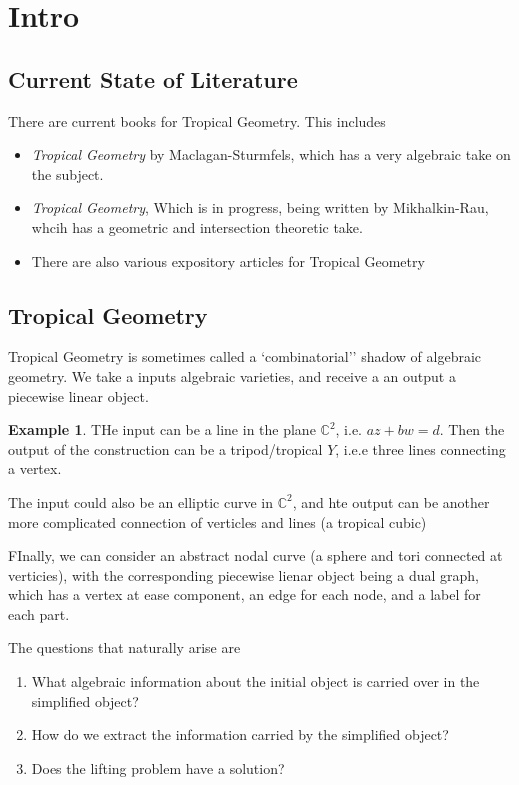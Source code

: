\documentclass[12pt]{memoir}
\theoremstyle{definition}
\newtheorem{protoexample}{Example}[section]
\newenvironment{ex}
   {\begin{protoexample}}
   {\end{protoexample}}
\def\CC{{\mathbb C}}
\begin{document}
\section{Intro}

\subsection{Current State of Literature}

There are current books for Tropical Geometry. This includes
\begin{itemize}
    \item \emph{Tropical Geometry} by Maclagan-Sturmfels, which has a very algebraic take on the subject.
    \item \emph{Tropical Geometry}, Which is in progress, being written by Mikhalkin-Rau, whcih has a geometric and intersection theoretic take.
    \item There are also various expository articles for Tropical Geometry
\end{itemize}

\subsection{Tropical Geometry}

Tropical Geometry is sometimes called a `combinatorial'' shadow of algebraic geometry. We take a inputs algebraic varieties, and receive a an output a piecewise linear object.

\begin{ex}
    THe input can be a line in the plane $\CC^2$, i.e. $az+bw=d$. Then the output of the construction can be a tripod/tropical $Y$, i.e.e three lines connecting a vertex.


    The input could also be an elliptic curve in $\CC^2$, and hte output can be another more complicated connection of verticles and lines (a tropical cubic)


    FInally, we can consider an abstract  nodal curve (a sphere and tori connected at verticies), with the corresponding piecewise lienar object being a dual graph, which has a vertex at ease component, an edge for each node, and a label for each part.
\end{ex}



The questions that naturally arise are
\begin{enumerate}
    \item What algebraic information about the initial object is carried over in the simplified object?
    \item How do we extract the information carried by the simplified object?
    \item Does the lifting problem have a solution?
\end{enumerate}
\end{document}
